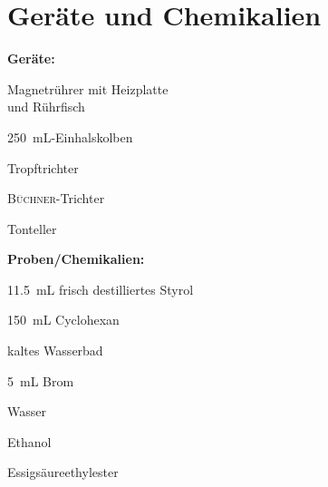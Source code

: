 \section{Geräte und Chemikalien}
\label{sec:geraete}

\textbf{Geräte:}
\begin{itemize}
	\begin{minipage}{0.45\textwidth}
		\item Magnetrührer mit Heizplatte \\ und Rührfisch
		\item \SI{250}{\milli \liter}-Einhalskolben
	\end{minipage}
	\begin{minipage}{0.45\textwidth}
		\item Tropftrichter
		\item \textsc{Büchner}-Trichter
		\item Tonteller
	\end{minipage}
\end{itemize}

\textbf{Proben/Chemikalien:}
\begin{itemize}
	\begin{minipage}{0.45 \textwidth}
		\item \SI{11,5}{\milli \liter} frisch destilliertes Styrol
		\item \SI{150}{\milli \liter} Cyclohexan
		\item kaltes Wasserbad
		\item \SI{5}{\milli \liter} Brom
	\end{minipage}
\begin{minipage}{0.45 \textwidth}
	\item Wasser
	\item Ethanol
	\item Essigsäureethylester
\end{minipage}
\end{itemize}



